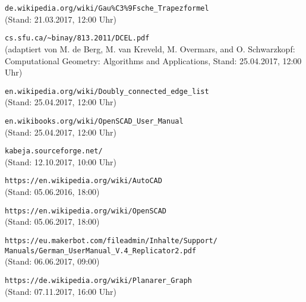 \nocite{*}
\begin{thebibliography}{9}
		\verb|de.wikipedia.org/wiki/Gau%C3%9Fsche_Trapezformel| \\ (Stand: 21.03.2017, 12:00 Uhr)
		
		 \verb|cs.sfu.ca/~binay/813.2011/DCEL.pdf| \\ (adaptiert von M. de Berg, M. van Kreveld, M. Overmars, and O. Schwarzkopf: Computational Geometry: Algorithms and Applications, Stand: 25.04.2017, 12:00 Uhr)

		 \verb|en.wikipedia.org/wiki/Doubly_connected_edge_list| \\ (Stand: 25.04.2017, 12:00 Uhr)
		
		 \verb|en.wikibooks.org/wiki/OpenSCAD_User_Manual| \\ (Stand: 25.04.2017, 12:00 Uhr)
		
		 \verb|kabeja.sourceforge.net/| \\ (Stand: 12.10.2017, 10:00 Uhr)
		
		 
		 \verb|https://en.wikipedia.org/wiki/AutoCAD| \\ (Stand: 05.06.2016, 18:00)
		 
		 \verb|https://en.wikipedia.org/wiki/OpenSCAD| \\ (Stand: 05.06.2017, 18:00)
		 
		\verb|https://eu.makerbot.com/fileadmin/Inhalte/Support/| \\
		\tab \verb|Manuals/German_UserManual_V.4_Replicator2.pdf| \\ (Stand: 06.06.2017, 09:00)
	
		\verb|https://de.wikipedia.org/wiki/Planarer_Graph| \\ (Stand: 07.11.2017, 16:00 Uhr)
	
\end{thebibliography}